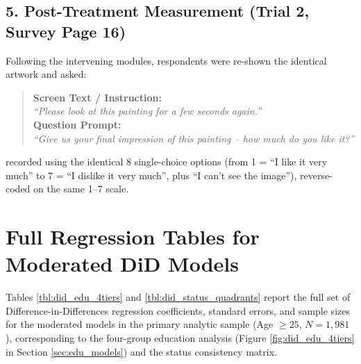 \documentclass[12pt, letterpaper]{article}
\begin{document}
\subsection*{5. Post-Treatment Measurement (Trial 2, Survey Page 16)}
Following the intervening modules, respondents were re-shown the identical artwork and asked:
\begin{quote}
\textbf{Screen Text / Instruction:} \\
\textit{``Please look at this painting for a few seconds again.''} \\[4pt]
\textbf{Question Prompt:} \\
\textit{``Give us your final impression of this painting -- how much do you like it?''}
\end{quote}
recorded using the identical 8 single-choice options (from 1 = ``I like it very much'' to 7 = ``I dislike it very much'', plus ``I can't see the image''), reverse-coded on the same 1--7 scale.

\section{Full Regression Tables for Moderated DiD Models}
\label{sec:appendix_regression_tables}
Tables \ref{tbl:did_edu_4tiers} and \ref{tbl:did_status_quadrants} report the full set of Difference-in-Differences regression coefficients, standard errors, and sample sizes for the moderated models in the primary analytic sample (Age $\ge 25$, $N = 1,981$), corresponding to the four-group education analysis (Figure \ref{fig:did_edu_4tiers} in Section \ref{sec:edu_models}) and the status consistency matrix.




\end{document}
